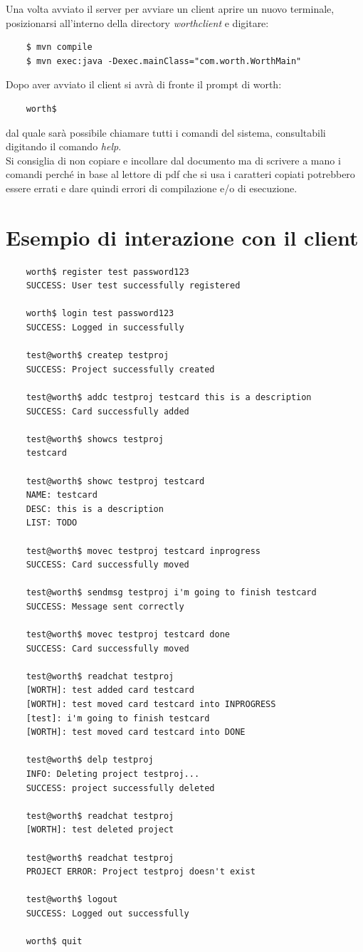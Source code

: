 \documentclass[11pt]{report}
\begin{document}
	Una volta avviato il server per avviare un client aprire un nuovo terminale, posizionarsi all'interno della directory \textit{worthclient} e digitare:
	\begin{lstlisting}
	$ mvn compile
	$ mvn exec:java -Dexec.mainClass="com.worth.WorthMain"
	\end{lstlisting}
	Dopo aver avviato il client si avrà di fronte il prompt di worth:
	\begin{lstlisting}
	worth$
	\end{lstlisting}
	dal quale sarà possibile chiamare tutti i comandi del sistema, consultabili digitando il comando \textit{help}.\\
	
	Si consiglia di non copiare e incollare dal documento ma di scrivere a mano i comandi perché in base al lettore di pdf che si usa i caratteri copiati potrebbero essere errati e dare quindi errori di compilazione e/o di esecuzione.\\
	
	\section{Esempio di interazione con il client}
	\begin{lstlisting}
	worth$ register test password123
	SUCCESS: User test successfully registered
	
	worth$ login test password123
	SUCCESS: Logged in successfully
	
	test@worth$ createp testproj
	SUCCESS: Project successfully created
	
	test@worth$ addc testproj testcard this is a description
	SUCCESS: Card successfully added
	
	test@worth$ showcs testproj
	testcard
	
	test@worth$ showc testproj testcard
	NAME: testcard
	DESC: this is a description
	LIST: TODO
	
	test@worth$ movec testproj testcard inprogress
	SUCCESS: Card successfully moved
	
	test@worth$ sendmsg testproj i'm going to finish testcard
	SUCCESS: Message sent correctly
	
	test@worth$ movec testproj testcard done
	SUCCESS: Card successfully moved
	
	test@worth$ readchat testproj
	[WORTH]: test added card testcard
	[WORTH]: test moved card testcard into INPROGRESS
	[test]: i'm going to finish testcard
	[WORTH]: test moved card testcard into DONE
	
	test@worth$ delp testproj
	INFO: Deleting project testproj...
	SUCCESS: project successfully deleted
	
	test@worth$ readchat testproj
	[WORTH]: test deleted project
	
	test@worth$ readchat testproj
	PROJECT ERROR: Project testproj doesn't exist
	
	test@worth$ logout
	SUCCESS: Logged out successfully
	
	worth$ quit
	\end{lstlisting}
	
	
	
	

	
	
	
	
	 
	
	
	 
	
	
	
	
	
	
\end{document}
